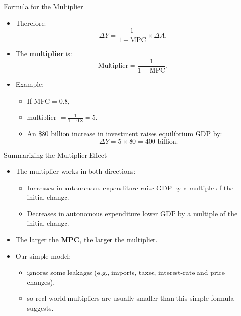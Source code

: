 \documentclass[aspectratio=169]{beamer}
\begin{document}
\begin{frame}{Formula for the Multiplier}
\transfade
\begin{itemize}[<+->]
  \item Therefore:
  \[
    \Delta Y = \frac{1}{1 - \text{MPC}} \times \Delta A.
  \]
  \item The \textbf{multiplier} is:
  \[
    \text{Multiplier} = \frac{1}{1 - \text{MPC}}.
  \]
  \item Example:
  \begin{itemize}[<+->]
    \item If \(\text{MPC} = 0.8\),
    \item multiplier \(= \frac{1}{1 - 0.8} = 5\).
    \item An \$80 billion increase in investment raises equilibrium GDP by:
    \[
      \Delta Y = 5 \times 80 = 400 \text{ billion}.
    \]
  \end{itemize}
\end{itemize}
\end{frame}

\begin{frame}{Summarizing the Multiplier Effect}
\transfade
\begin{itemize}[<+->]
  \item The multiplier works in both directions:
  \begin{itemize}[<+->]
    \item Increases in autonomous expenditure raise GDP by a multiple of the initial change.
    \item Decreases in autonomous expenditure lower GDP by a multiple of the initial change.
  \end{itemize}
  \item The larger the \textbf{MPC}, the larger the multiplier.
  \item Our simple model:
  \begin{itemize}[<+->]
    \item ignores some leakages (e.g., imports, taxes, interest-rate and price changes),
    \item so real-world multipliers are usually smaller than this simple formula suggests.
  \end{itemize}
\end{itemize}
\end{frame}
\end{document}
